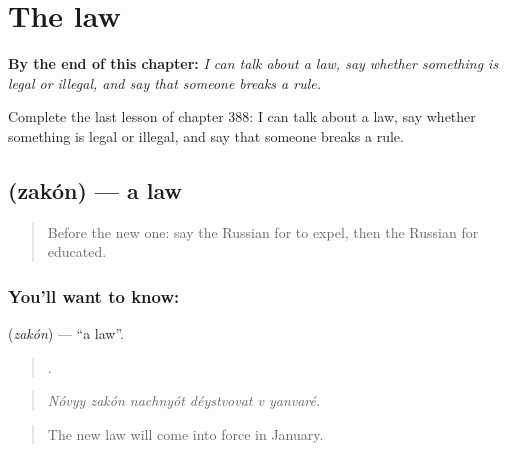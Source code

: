 
\chapter{The law}
\label{ch:ru-the-law}

\begin{chapteropening}
\textbf{By the end of this chapter:} \emph{I can talk about a law, say whether something is legal or illegal, and say that someone breaks a rule.}

Complete the last lesson of chapter 388: I can talk about a law, say whether something is legal or illegal, and say that someone breaks a rule.
\end{chapteropening}

\section[\texorpdfstring{\ru{закон} (zakón)}{закон (zakón)}]{ (zakón) — a law}

\label{lesson:RU-C388-zakon}



\begin{quote}
Before the new one: say the Russian for to expel, then the Russian for educated.
\end{quote}

\subsection*{You'll want to know: }
\textbf{} (\emph{zakón}) — \textquotedblleft{}a law\textquotedblright{}.

\begin{quote}
     .
\end{quote}

\begin{quote}
\emph{Nóvyy zakón nachnyót déystvovat v yanvaré.}
\end{quote}

\begin{quote}
The new law will come into force in January.
\end{quote}

